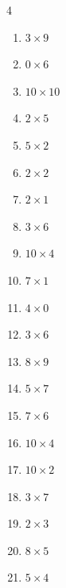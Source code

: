 \begin{multicols}{4}
\begin{enumerate}
  \item $3\times 9$
        \phantom{$=27$}

  \item $0\times 6$
        \phantom{$=0$}

  \item $10\times 10$
        \phantom{$=100$}

  \item $2\times 5$
        \phantom{$=10$}

  \item $5\times 2$
        \phantom{$=10$}

  \item $2\times 2$
        \phantom{$=4$}

  \item $2\times 1$
        \phantom{$=2$}

  \item $3\times 6$
        \phantom{$=18$}

  \item $10\times 4$
        \phantom{$=40$}

  \item $7\times 1$
        \phantom{$=7$}

  \item $4\times 0$
        \phantom{$=0$}

  \item $3\times 6$
        \phantom{$=18$}

  \item $8\times 9$
        \phantom{$=72$}

  \item $5\times 7$
        \phantom{$=35$}

  \item $7\times 6$
        \phantom{$=42$}

  \item $10\times 4$
        \phantom{$=40$}

  \item $10\times 2$
        \phantom{$=20$}

  \item $3\times 7$
        \phantom{$=21$}

  \item $2\times 3$
        \phantom{$=6$}

  \item $8\times 5$
        \phantom{$=40$}

\columnbreak %

  \item $5\times 4$
        \phantom{$=20$}


\end{enumerate}
\end{multicols}
